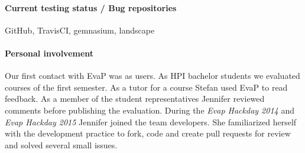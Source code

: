 \paragraph{Current testing status / Bug repositories}

GitHub, TravisCI, gemnasium, landscape

\paragraph{Personal involvement}
Our first contact with EvaP was as users. 
As HPI bachelor students we evaluated courses of the first semester.
As a tutor for a course Stefan used EvaP to read feedback.
As a member of the student representatives Jennifer reviewed comments before publishing the evaluation.
During the \emph{Evap Hackday 2014} and \emph{Evap Hackday 2015} Jennifer joined the team developers.
She familiarized herself with the development practice to fork, code and create pull requests for review and solved several small issues.
